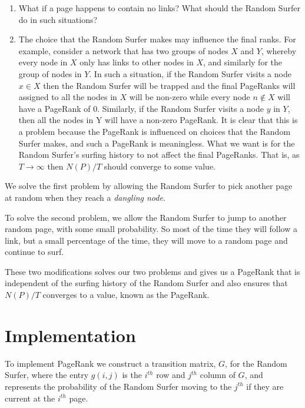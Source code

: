 \documentclass[pdftex,11pt,a4paper]{report}
\begin{document}
\begin{enumerate}
   \item What if a page happens to contain no links? What should the Random Surfer do
         in such situations?
   \item The choice that the Random Surfer makes may influence the final ranks. For example,
         consider a network that has two groups of nodes $X$ and $Y$, whereby every node in
         $X$ only has links to other nodes in $X$, and similarly for the group of nodes in $Y$.
         In such a situation, if the Random Surfer visits a node $x \in X$ then the Random Surfer
         will be trapped and the final PageRanks will assigned to all the nodes in $X$ will be non-zero
         while every node $n \not \in X$ will have a PageRank of 0. Similarly, if the Random Surfer visits
         a node $y$ in $Y$, then all the nodes in Y will have a non-zero PageRank. It is clear that
         this is a problem because the PageRank is influenced on choices that the Random Surfer makes,
         and such a PageRank is meaningless.
         What we want is for the Random Surfer's surfing history to not affect the final PageRanks. That is,
         as $T \rightarrow \infty$ then $N(P) / T$ should converge to some value.
\end{enumerate}

We solve the first problem by allowing the Random Surfer to pick another page at random when
they reach a \emph{dangling node}. 

To solve the second problem, we allow the Random Surfer to jump to another random page, 
with some small probability. So most of the time they will follow a link, but a small
percentage of the time, they will move to a random page and continue to surf.

These two modifications solves our two problems and gives us a PageRank that is independent of
the surfing history of the Random Surfer and also ensures that $N(P) / T$ converges to a 
value, known as the PageRank.

\section{Implementation}

To implement PageRank we construct a transition matrix, $G$, for the Random Surfer, where the
entry $g(i,j)$ is the $i^{th}$ row and $j^{th}$ column of $G$, and represents the probability
of the Random Surfer moving to the $j^{th}$ if they are current at the $i^{th}$ page.
\end{document}
